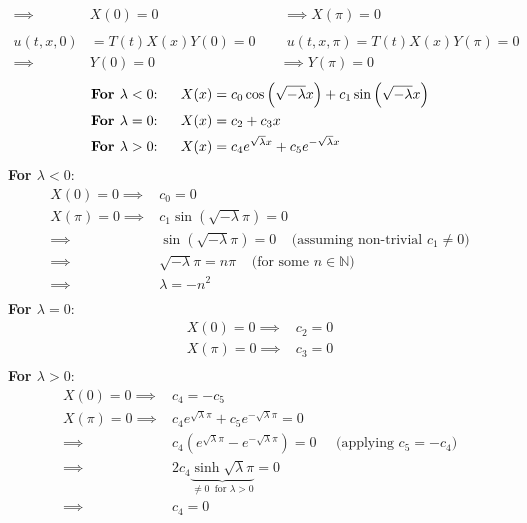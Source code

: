 \documentclass[12pt]{article}
\begin{document}
{\begin{align*}
\implies& X(0) = 0 \;\;\;\;\;\;\;\;\;\;\;\;\;\;\;\;\;\;\;\;\;\;\;\;\;\;\;\;\;\;\;\;  \implies X(\pi) = 0  \\ \\
u(t,x,0) &= T(t)X(x)Y(0) = 0 \;\;\;\;\;\;\;\; u(t,x,\pi) = T(t)X(x)Y(\pi) = 0  \\
\implies& Y(0) = 0 \;\;\;\;\;\;\;\;\;\;\;\;\;\;\;\;\;\;\;\;\;\;\;\;\;\;\;\;\;\;\;\;  \implies Y(\pi) = 0 
\end{align*}
\begin{align*}
\text{\textbf{For $\lambda < 0$}:} \;\;\;\;\;\; & X(x) = c_0 \cos \left( \sqrt{-\lambda} x \right) + c_1 \sin \left( \sqrt{-\lambda} x \right) \\
\text{\textbf{For $\lambda = 0$}:} \;\;\;\;\;\; & X(x) = c_2 + c_3 x \\
\text{\textbf{For $\lambda > 0$}:} \;\;\;\;\;\; & X(x) = c_4 e^{\sqrt{\lambda} x} + c_5 e^{-\sqrt{\lambda}x }
\end{align*}
\textbf{For $\lambda < 0$}:
\begin{align*}
X(0) = 0 \implies& \boxed{c_0 = 0} \\
X(\pi) = 0 \implies& c_1 \sin \left( \sqrt{-\lambda} \pi \right) = 0 \\
\implies& \sin \left( \sqrt{-\lambda} \pi \right) = 0 \;\;\;\; \text{(assuming non-trivial $c_1 \neq 0$)} \\
\implies& \sqrt{-\lambda} \pi = n\pi \;\;\;\; \text{(for some $n \in \mathbb{N}$)} \\
\implies& \boxed{\lambda = -n^2} \\
\end{align*}
\textbf{For $\lambda = 0$}:
\begin{align*}
X(0) = 0 \implies& \boxed{c_2 = 0} \\
X(\pi) = 0 \implies& \boxed{c_3 = 0} \\
\end{align*}
\textbf{For $\lambda > 0$}:
\begin{align*}
X(0) = 0 \implies& \boxed{c_4 = -c_5} \\
X(\pi) = 0 \implies& c_4 e^{\sqrt{\lambda} \pi} + c_5 e^{-\sqrt{\lambda} \pi} = 0 \\
\implies& c_4 \left(  e^{\sqrt{\lambda} \pi} - e^{-\sqrt{\lambda} \pi} \right) = 0 \;\;\;\;\; \text{(applying $c_5 = -c_4$)} \\
\implies& 2c_4 \underbrace{\sinh{\sqrt{\lambda} \pi}}_{\neq 0 \;\; \text{for $\lambda > 0$}}= 0 \\
\implies& \boxed{c_4 = 0} \\

\end{align*}}
\end{document}
